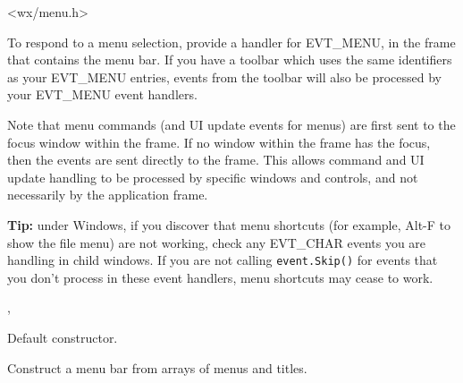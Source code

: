 
<wx/menu.h>


To respond to a menu selection, provide a handler for EVT\_MENU, in the frame
that contains the menu bar. If you have a toolbar which uses the same identifiers
as your EVT\_MENU entries, events from the toolbar will also be processed by your
EVT\_MENU event handlers.

Note that menu commands (and UI update events for menus) are first sent to
the focus window within the frame. If no window within the frame has the focus,
then the events are sent directly to the frame. This allows command and UI update
handling to be processed by specific windows and controls, and not necessarily
by the application frame.

{\bf Tip:} under Windows, if you discover that menu shortcuts (for example, Alt-F to show the file menu)
are not working, check any EVT\_CHAR events you are handling in child windows.
If you are not calling {\tt event.Skip()} for events that you don't process in these event handlers,
menu shortcuts may cease to work.


, 


\label{wxmenubarconstr}


Default constructor.


Construct a menu bar from arrays of menus and titles.







